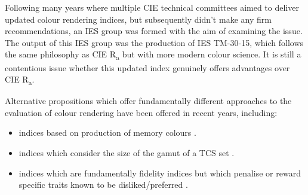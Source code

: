 Following many years where multiple \gls{CIE} technical committees aimed to deliver updated colour rendering indices, but subsequently didn't make any firm recommendations, an IES group was formed with the aim of examining the issue. The output of this IES group was the production of IES TM-30-15\cite{color_metric_task_group_of_the_ies_ies_2015}, which follows the same philosophy as \gls{CIE} R\textsubscript{a} but with more modern colour science. It is still a contentious issue whether this updated index genuinely offers advantages over \gls{CIE} R\textsubscript{a}. 

Alternative propositions which offer fundamentally different approaches to the evaluation of colour rendering have been offered in recent years, including: 
\begin{itemize}
\item indices based on production of memory colours \citep{smet_memory_2012}.
\item indices which consider the size of the gamut of a TCS set \citep{rea_color_2008,teunissen_characterising_2016}.
\item indices which are fundamentally fidelity indices but which penalise or reward specific traits known to be disliked/preferred \citep{ohno_rationale_2010}.
\end{itemize}

